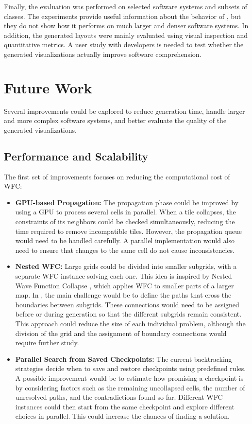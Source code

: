 \documentclass[../main.tex]{subfiles}
\begin{document}
Finally, the evaluation was performed on selected software systems and subsets of classes. The experiments provide useful information about the behavior of \wassis, but they do not show how it performs on much larger and denser software systems. In addition, the generated layouts were mainly evaluated using visual inspection and quantitative metrics. A user study with developers is needed to test whether the generated visualizations actually improve software comprehension.

\section{Future Work}

Several improvements could be explored to reduce generation time, handle larger and more complex software systems, and better evaluate the quality of the generated visualizations.

\subsection{Performance and Scalability}
The first set of improvements focuses on reducing the computational cost of WFC:

\begin{itemize}
    \item \textbf{GPU-based Propagation:} The propagation phase could be improved by using a GPU to process several cells in parallel. When a tile collapses, the constraints of its neighbors could be checked simultaneously, reducing the time required to remove incompatible tiles. However, the propagation queue would need to be handled carefully. A parallel implementation would also need to ensure that changes to the same cell do not cause inconsistencies.

    \item \textbf{Nested WFC:} Large grids could be divided into smaller subgrids, with a separate WFC instance solving each one. This idea is inspired by Nested Wave Function Collapse \cite{Nie2023a}, which applies WFC to smaller parts of a larger map. In \wassis, the main challenge would be to define the paths that cross the boundaries between subgrids. These connections would need to be assigned before or during generation so that the different subgrids remain consistent. This approach could reduce the size of each individual problem, although the division of the grid and the assignment of boundary connections would require further study.

    \item \textbf{Parallel Search from Saved Checkpoints:} The current backtracking strategies decide when to save and restore checkpoints using predefined rules. A possible improvement would be to estimate how promising a checkpoint is by considering factors such as the remaining uncollapsed cells, the number of unresolved paths, and the contradictions found so far. Different WFC instances could then start from the same checkpoint and explore different choices in parallel. This could increase the chances of finding a solution.
\end{itemize}
\end{document}
